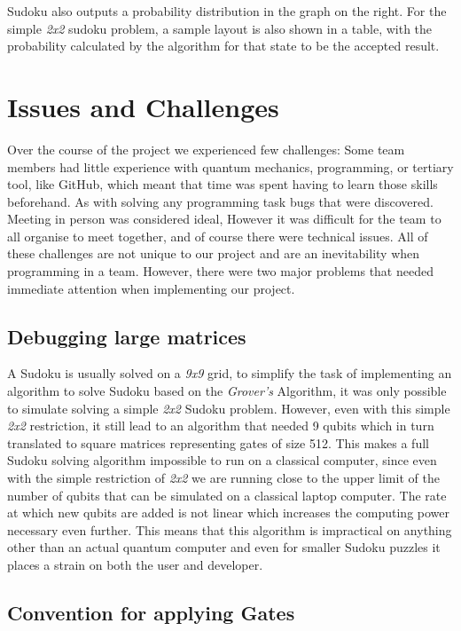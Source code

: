 \documentclass{article}
\begin{document}
Sudoku also outputs a probability distribution in the graph on the right.
For the simple \textit{2x2} sudoku problem, a sample layout is also shown in a table, with the probability calculated by the algorithm for that state to be the accepted result.

\pagebreak

\section{Issues and Challenges}

Over the course of the project we experienced few challenges:
Some team members had little experience with quantum mechanics, programming, or tertiary tool, like GitHub, which meant that time was spent having to learn those skills beforehand.
As with solving any programming task bugs that were discovered. Meeting in person was considered ideal, However it was difficult for the team to all organise to meet together, and of course there were technical issues.
All of these challenges are not unique to our project and are an inevitability when programming in a team.
However, there were two major problems that needed immediate attention when implementing our project.

\subsection{Debugging large matrices}

A Sudoku is usually solved on a \textit{9x9} grid, to simplify the task of implementing an algorithm to solve Sudoku based on the \textit{Grover's} Algorithm, it was only possible to simulate solving a simple \textit{2x2} Sudoku problem.
However, even with this simple \textit{2x2} restriction, it still lead to an algorithm that needed 9 qubits which in turn translated to square matrices representing gates of size 512.
This makes a full Sudoku solving algorithm impossible to run on a classical computer, since even with the simple restriction of \textit{2x2} we are running close to the upper limit of the number of qubits that can be simulated on a classical laptop computer.
The rate at which new qubits are added is not linear which increases the computing power necessary even further.
This means that this algorithm is impractical on anything other than an actual quantum computer and even for smaller Sudoku puzzles it places a strain on both the user and developer. 

\subsection{Convention for applying Gates}
\end{document}
